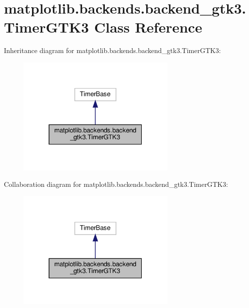 \hypertarget{classmatplotlib_1_1backends_1_1backend__gtk3_1_1TimerGTK3}{}\section{matplotlib.\+backends.\+backend\+\_\+gtk3.\+Timer\+G\+T\+K3 Class Reference}
\label{classmatplotlib_1_1backends_1_1backend__gtk3_1_1TimerGTK3}


Inheritance diagram for matplotlib.\+backends.\+backend\+\_\+gtk3.\+Timer\+G\+T\+K3\+:
\nopagebreak
\begin{figure}[H]
\begin{center}
\leavevmode
\includegraphics[width=223pt]{classmatplotlib_1_1backends_1_1backend__gtk3_1_1TimerGTK3__inherit__graph}
\end{center}
\end{figure}


Collaboration diagram for matplotlib.\+backends.\+backend\+\_\+gtk3.\+Timer\+G\+T\+K3\+:
\nopagebreak
\begin{figure}[H]
\begin{center}
\leavevmode
\includegraphics[width=223pt]{classmatplotlib_1_1backends_1_1backend__gtk3_1_1TimerGTK3__coll__graph}
\end{center}
\end{figure}
